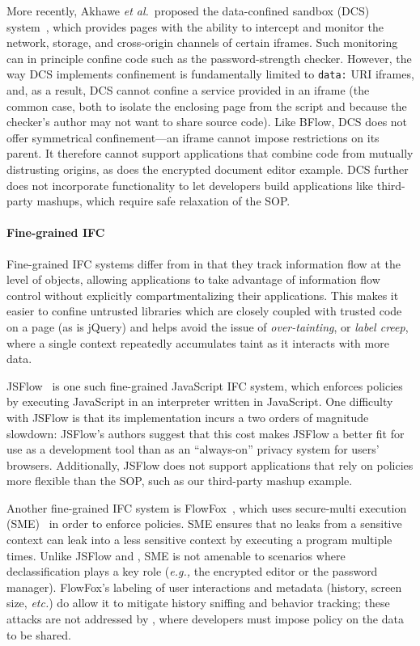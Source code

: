 More recently, Akhawe \emph{et al.}~proposed the data-confined
sandbox (DCS) system~\cite{Akhawe2013}, which provides pages with the
ability to intercept and monitor the network, storage, and cross-origin
channels of certain iframes.
%
Such monitoring can in principle confine code such as the
password-strength checker.
%
However, the way DCS implements confinement is fundamentally limited to \verb|data:|
URI iframes, and, as a result, DCS cannot confine a service provided
in an iframe (the common case, both to isolate the enclosing page from
the script and because the checker's author may not want to share
source code\cite{postman}).
%
Like BFlow, DCS does not offer symmetrical confinement---an iframe
cannot impose restrictions on its parent. It therefore cannot support
applications that combine code from mutually distrusting origins, as
does the encrypted document editor example.
%
DCS further does not incorporate functionality to let developers build
applications like third-party mashups, which require safe relaxation of the
SOP\@.

\paragraph{Fine-grained IFC}
Fine-grained IFC systems differ from \sys{} in that they track
information flow at the level of objects, allowing applications
to take advantage of information flow control without explicitly
compartmentalizing their applications. This makes it easier to
confine untrusted libraries which are closely coupled with trusted
code on a page (as is jQuery) and helps avoid the issue of
\emph{over-tainting}, or \emph{label creep},
where a single context repeatedly accumulates taint as it interacts
with more data.

JSFlow~\cite{JSFlow} is one such fine-grained JavaScript IFC system, which
enforces policies by executing JavaScript in an interpreter written in
JavaScript.
%
One difficulty with JSFlow is that
its implementation incurs a two orders of magnitude slowdown:
JSFlow's authors suggest that this cost makes JSFlow a better fit for use as a development tool than
as an ``always-on'' privacy system for users' browsers.
%
Additionally, JSFlow does not support applications that rely on policies
more flexible than the SOP, such as our third-party mashup example.

Another fine-grained IFC system is FlowFox~\cite{DeGroef:2012},
which uses secure-multi execution
(SME)~\cite{Devriese:2010} in order to enforce policies. SME ensures that no leaks
from a sensitive context can leak into a less sensitive context by
executing a program multiple times.
%
Unlike JSFlow and \sys{}, SME is not amenable to
scenarios where declassification plays a key role (\emph{e.g.,} the encrypted
editor or the password manager).
%
FlowFox's labeling of user interactions and metadata (history, screen
size, \emph{etc.}) do allow it to mitigate history sniffing and behavior
tracking;
these attacks are not addressed by \sys{}, where developers must
impose policy on the data to be shared.

